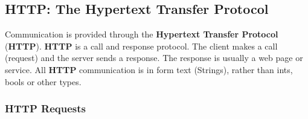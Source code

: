 \documentclass[11pt]{article}
\begin{document}
\subsection{HTTP: The Hypertext Transfer Protocol}
\label{sec:http}

Communication is provided through the \textbf{Hypertext Transfer Protocol} (\textbf{HTTP}). \textbf{HTTP} is a call and response protocol. The client makes a call (request) and the server sends a response. The response is usually a web page or service. All \textbf{HTTP} communication is in form text (Strings), rather than ints, bools or other types.

\subsubsection{HTTP Requests}
\end{document}
